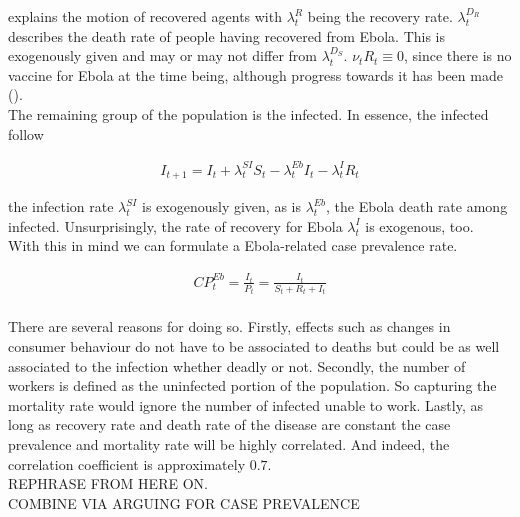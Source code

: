 \documentclass{article}
\begin{document}
explains the motion of recovered agents with $\lambda_t^{R}$ being the recovery rate. $\lambda_t^{D_R}$ describes the death rate of people having recovered from Ebola. This is exogenously given and may or may not differ from $\lambda_t^{D_S}$. $\nu_t R_t \equiv 0$, since there is no vaccine for Ebola at the time being, although progress towards it has been made (\cite{ledgerwood2017chimpanzee}).\\
The remaining group of the population is the infected. In essence, the infected follow

\begin{align*}
I_{t+1} = I_t + \lambda_t^{SI} S_t - \lambda_t^{Eb} I_t - \lambda_t^{I} R_t
\end{align*}

the infection rate $\lambda_t^{SI}$ is exogenously given, as is $\lambda_t^{Eb}$, the Ebola death rate among infected. Unsurprisingly, the rate of recovery for Ebola $\lambda_t^{I}$ is exogenous, too. \\
With this in mind we can formulate a Ebola-related case prevalence rate.

\begin{align*}
CP_{t}^{Eb} = \frac{I_t}{P_t} = \frac{I_t}{S_t + R_t + I_t} \\
\end{align*} 

There are several reasons for doing so. Firstly, effects such as changes in consumer behaviour do not have to be associated to deaths but could be  as well associated to the infection whether deadly or not. Secondly, the number of workers is defined as the uninfected portion of the population. So capturing the mortality rate would ignore the number of infected unable to work. Lastly, as long as recovery rate and death rate of the disease are constant the case prevalence and mortality rate will be highly correlated. And indeed, the correlation coefficient is approximately $0.7$. \\

REPHRASE FROM HERE ON. \\
		COMBINE VIA ARGUING FOR CASE PREVALENCE \\
\end{document}
